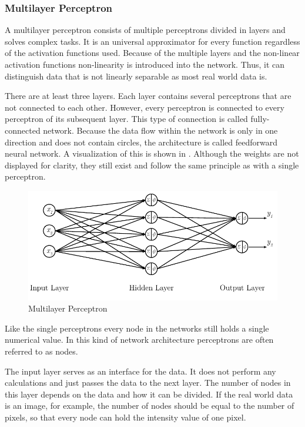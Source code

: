 \subsubsection{Multilayer Perceptron}
\label{sec:mlp-multilayer-perceptron}
A multilayer perceptron consists of multiple perceptrons divided in layers and solves complex tasks.
It is an universal approximator for every function\cite{Cybenko1989} regardless of the activation functions used\cite{Hornik1991}.
Because of the multiple layers and the non-linear activation functions non-linearity is introduced into the network.
Thus, it can distinguish data that is not linearly separable as most real world data is.

There are at least three layers.
Each layer contains several perceptrons that are not connected to each other.
However, every perceptron is connected to every perceptron of its subsequent layer.
This type of connection is called fully-connected network.
Because the data flow within the network is only in one direction and does not contain circles, the architecture is called feedforward neural network.
A visualization of this is shown in .
Although the weights are not displayed for clarity, they still exist and follow the same principle as with a single perceptron.
\begin{figure}
	\centering
	\includegraphics{images/multilayer-perceptron}
	\caption{Multilayer Perceptron}
	\label{fig:multilayer-perceptron}
\end{figure}
Like the single perceptrons every node in the networks still holds a single numerical value.
In this kind of network architecture perceptrons are often referred to as nodes.

The input layer serves as an interface for the data.
It does not perform any calculations and just passes the data to the next layer.
The number of nodes in this layer depends on the data and how it can be divided.
If the real world data is an image, for example, the number of nodes should be equal to the number of pixels, so that every node can hold the intensity value of one pixel.

